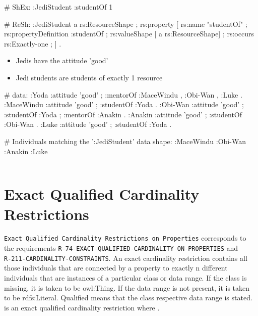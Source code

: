 \documentclass{llncs}
\newcommand{\ms}[1]{\texttt{#1}}
\newenvironment{DL}{
\vspace{0cm}
	\begin{center}
  \begin{tabular}{r l}

}{
  \end{tabular}
	\end{center}
}
\begin{document}
\begin{ex}
# ShEx:
:JediStudent {
    :studentOf {}{1} }
\end{ex}

\begin{ex}
# ReSh:
:JediStudent a rs:ResourceShape ;
    rs:property [
        rs:name "studentOf" ;
        rs:propertyDefinition :studentOf ;
        rs:valueShape [ a rs:ResourceShape] ;
        rs:occurs rs:Exactly-one ; ] .
\end{ex}

\begin{itemize}
	\item Jedis have the attitude 'good'
	\item Jedi students are students of exactly 1 resource
\end{itemize}

\begin{ex}
# data:
:Yoda 
    :attitude 'good' ;
    :mentorOf :MaceWindu , :Obi-Wan , :Luke .
:MaceWindu
    :attitude 'good' ;
    :studentOf :Yoda .
:Obi-Wan 
    :attitude 'good' ;
    :studentOf :Yoda ;
    :mentorOf :Anakin .
:Anakin
    :attitude 'good' ; 
    :studentOf :Obi-Wan .
:Luke
    :attitude 'good' ;
    :studentOf :Yoda .
\end{ex}

\begin{ex}
# Individuals matching the ’:JediStudent’ data shape:
:MaceWindu :Obi-Wan :Anakin :Luke
\end{ex}

\begin{DL}
 \\
\end{DL}

\section{Exact Qualified Cardinality Restrictions}

\ms{Exact Qualified Cardinality Restrictions on Properties} corresponds to the requirements
\ms{R-74-EXACT-QUALIFIED-CARDINALITY-ON-PROPERTIES} and \\
\ms{R-211-CARDINALITY-CONSTRAINTS}.
An exact cardinality restriction contains all those individuals that are connected by a property to exactly n different individuals that are instances of a particular class or data range. 
If the class is missing, it is taken to be owl:Thing. 
If the data range is not present, it is taken to be rdfs:Literal.
Qualified means that the class respective data range is stated. 
 is an exact qualified cardinality restriction where .
\end{document}

